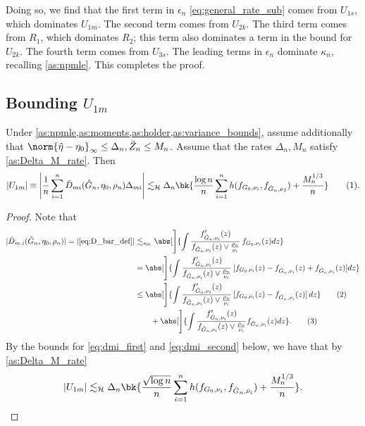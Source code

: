 \documentclass[12pt, reqno]{amsart}
\newcommand\numberthis{\addtocounter{equation}{1}\tag{\theequation}}
\newcommand{\absauto}[1]{\left| #1 \right|}
\newcommand{\leH}{\lesssim_{\mathcal{H}}}
\newcommand{\hateta}{\hat\eta}
\newcommand{\Dinfty}{\norm{\hateta - \eta_0}_{\infty}} %
\numberwithin{equation}{section}
\begin{document}
\begin{refsection}
\begin{appendices}
Doing so, we find that the first term in $\epsilon_n$
\eqref{eq:general_rate_sub} comes from $U_{1s}$, which dominates $U_{1m}$. The second term
comes from $U_{2k}$. The third term comes from $R_1$, which
dominates $R_2$; this term also dominates a term in the bound for $U_{2k}$. The fourth
term comes from $U_ {3s}$. The leading terms in $\epsilon_n$
dominate $\kappa_n$, recalling \cref{as:npmle}. This completes the proof.




\subsection{Bounding $U_{1m}$}

\begin{lemma}
\label{lemma:Dmi_final}
    Under \cref{as:npmle,as:moments,as:holder,as:variance_bounds}, assume additionally that
    $\Dinfty \le
    \Delta_n, \bar Z_n \le M_n$. Assume that the rates $\Delta_n, M_n$ satisfy 
    \cref{as:Delta_M_rate}.
    Then \[
    |U_{1m}| \equiv \absauto{\frac{1}{n} \sum_{i=1}^n \bar D_{mi} (\hat G_n, \eta_0, \rho_n) \Delta_{mi}} \leH \Delta_n \bk{
    \frac{\log n}{n} \sum_ {i=1}^n h(f_{G_0, \nu_i}, f_ {\hat G_n,\nu_I}) + \frac{M_n^
    {1/3}}
    {n}}
    \numberthis \label{eq:Dmi_final}.\]
\end{lemma}
\begin{proof}
Note that \begin{align*}
|\bar D_{m,i}(\hat G_n,\eta_0,\rho_n)| = |\eqref{eq:D_bar_def}|
&\lesssim_{s_{0\ell}} \abs[\Bigg]{\int \frac{f'_{\hat G_n, \nu_i}
(z)}{
f_{\hat G_n, \nu_i}(z)
 \vee \frac{\rho_n}{\nu_i}}
\, f_{G_0, \nu_i}(z) dz}
\\
&= \abs[\Bigg]{\int \frac{f'_{\hat G_n, \nu_i}
(z)}{
f_{\hat G_n, \nu_i}(z)
 \vee \frac{\rho_n}{\nu_i}}
\, [f_{G_0, \nu_i}(z) - f_{\hat G_n, \nu_i}(z) + f_{\hat G_n, \nu_i}(z)] dz} \\
&\le \abs[\Bigg]{\int \frac{f'_{\hat G_n, \nu_i}
(z)}{
f_{\hat G_n, \nu_i}(z)
 \vee \frac{\rho_n}{\nu_i}}
\, [f_{G_0, \nu_i}(z) - f_{\hat G_n, \nu_i}(z)] \,dz}  \numberthis \label{eq:dmi_first} \\
&\quad\quad+ \abs[\Bigg]{ \int \frac{f'_{\hat G_n, \nu_i}
(z)}{
f_{\hat G_n, \nu_i}(z)
 \vee \frac{\rho_n}{\nu_i}} f_{\hat G_n, \nu_i}(z) dz }. \numberthis
 \label{eq:dmi_second}
\end{align*}
By the bounds for \eqref{eq:dmi_first} and \eqref{eq:dmi_second} below, we have that by \cref{as:Delta_M_rate} \[
|U_{1m}| \leH \Delta_n \bk{\frac{\sqrt{\log n}}{n} \sum_{i=1}^n h(f_{G_0, \nu_i}, f_{\hat
G_n,
\hat\nu_i}) +
\frac{M_n^{1/3}}{n}}.
\]
\end{proof}





\end{appendices}
\end{refsection}
\end{document}
